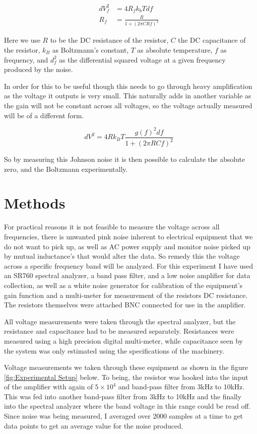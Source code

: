 \documentclass[aps,twocolumn,preprintnumbers]{revtex4}
\begin{document}
\begin{align}
     dV_f^2 &= 4R_f k_b T df
     \\
     R_f &= \frac{R}{1 + (2 \pi C R f)^2}
\end{align}

Here we use $R$ to be the DC resistance of the resistor, $C$ the DC capacitance of the resistor, $k_B$ as Boltzmann's constant, $T$ as absolute temperature, $f$ as frequency, and $d_f^2$ as the differential squared voltage at a given frequency produced by the noise. 

In order for this to be useful though this needs to go through heavy amplification as the voltage it outputs is very small. This naturally adds in another variable as the gain will not be constant across all voltages, so the voltage actually measured will be of a different form. 

\begin{equation}
    dV^2 = 4R k_B T \frac{g(f)^2 df}{1 + (2 \pi R C f)^2}
\end{equation}

So by measuring this Johnson noise it is then possible to calculate the absolute zero, and the Boltzmann experimentally. 

\section{Methods}

For practical reasons it is not feasible to measure the voltage across all frequencies, there is unwanted pink noise inherent to electrical equipment that we do not want to pick up, as well as AC power supply and monitor noise picked up by mutual inductance's that would alter the data. So remedy this the voltage across a specific frequency band will be analyzed. For this experiment I have used an SR760 spectral analyzer, a band pass filter, and a low noise amplifier for data collection, as well as a white noise generator for calibration of the equipment's gain function and a multi-meter for measurement of the resistors DC resistance. The resistors themselves were attached BNC connected for use in the amplifier. 

All voltage measurements were taken through the spectral analyzer, but the resistance and capacitance had to be measured separately. Resistances were measured using a high precision digital multi-meter, while capacitance seen by the system was only estimated using the specifications of the machinery. 

Voltage measurements we taken through these equipment as shown in the figure \ref{fig:Experimental Setup} below. To being, the resistor was hooked into the input of the amplifier with again of $5 \times 10^4$ and band-pass filter from 3kHz to 10kHz. This was fed into another band-pass filter from 3kHz to 10kHz and the finally into the spectral analyzer where the band voltage in this range could be read off. Since noise was being measured, I averaged over 2000 samples at a time to get data points to get an average value for the noise produced. 
\end{document}
